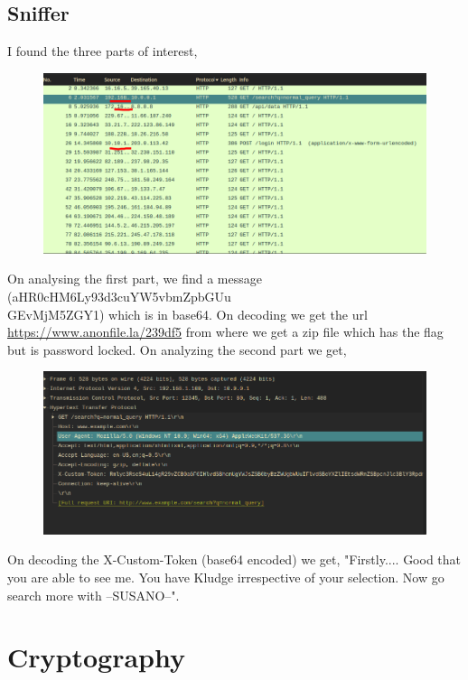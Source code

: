 \documentclass{article}
\begin{document}
\subsection{Sniffer}
I found the three parts of interest,
\begin{figure}[h!]
    \centering
    \includegraphics[width=1\linewidth]{figs/sniffer1.png}
    \label{fig:enter-label}
\end{figure}
\newline On analysing the first part, we find a message (aHR0cHM6Ly93d3cuYW5vbmZpbGUu\\GEvMjM5ZGY1) which is in base64. On decoding we get the url \url{https://www.anonfile.la/239df5} from where we get a zip file which has the flag but is password locked. On analyzing the second part we get, \pagebreak
\begin{figure}[h!]
    \centering
    \includegraphics[width=1\linewidth]{figs/sniffer3.png}
    \label{fig:enter-label}
\end{figure}
\newline On decoding the X-Custom-Token (base64 encoded) we get, "Firstly.... Good that you are able to see me. You have Kludge irrespective of your selection. Now go search more with --SUSANO--".
\section{Cryptography}
\end{document}
